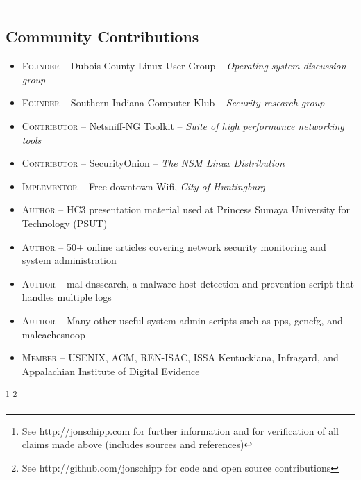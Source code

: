 \documentclass[10pt,letterpaper]{article}
\begin{document}
\hrule
\vspace{-0.4em}
\subsection*{Community Contributions}

\begin{itemize}
	\parskip=0.1em

	\item \textsc{Founder} -- Dubois County Linux User Group – \textit{Operating system discussion group}
	\item \textsc{Founder} -- Southern Indiana Computer Klub – \textit{Security research group}
	\item \textsc{Contributor} -- Netsniff-NG Toolkit – \textit{Suite of high performance networking tools}
	\item \textsc{Contributor} -- SecurityOnion – \textit{The NSM Linux Distribution}
	\item \textsc{Implementor} -- Free downtown Wifi, \textit{City of Huntingburg}
	\item \textsc{Author} -- HC3 presentation material used at Princess Sumaya University for Technology (PSUT)
	\item \textsc{Author} -- 50+ online articles covering network security monitoring and system administration
	\item \textsc{Author} -- mal-dnssearch, a malware host detection and prevention script that handles multiple logs
	\item \textsc{Author} -- Many other useful system admin scripts such as pps, gencfg, and malcachesnoop
	\item \textsc{Member} -- USENIX, ACM, REN-ISAC, ISSA Kentuckiana, Infragard, and Appalachian Institute of Digital Evidence

\end{itemize}

\let\thefootnote\relax\footnote{See http://jonschipp.com for further
information and for verification of all claims made above (includes sources and references)}
\let\thefootnote\relax\footnote{See http://github.com/jonschipp for code and open source contributions}
\end{document}
